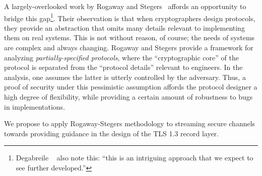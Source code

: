 A largely-overlooked work by Rogaway and Stegers~\cite{RS09}
affords an opportunity to bridge this gap\footnote{Degabreile
  \etal~\cite{DPW11} also note this: ``this is an intriguing approach
  that we expect to see further developed.''}. Their observation is that when
cryptographers design protocols, they provide an abstraction that omits many
details relevant to implementing them on real systems.
%
This is not without reason, of course; the needs of systems are complex and always
changing.
%
%
Rogaway and Stegers provide a framework for analyzing \emph{partially-specified
protocols}, where the ``cryptographic core'' of the protocol is separated from
the ``protocol details'' relevant to engineers. In the analysis, one assumes the
latter is utterly controlled by the adversary. Thus, a proof of security under
this pessimistic assumption affords the protocol designer a high degree of
flexibility, while providing a certain amount of robustness to bugs in
implementations.

\begin{task}\label{task:sc}
  We propose to apply Rogaway-Stegers methodology to streaming secure channels
  towards providing guidance in the design of the TLS 1.3 record layer.
\end{task}


\fi
%


